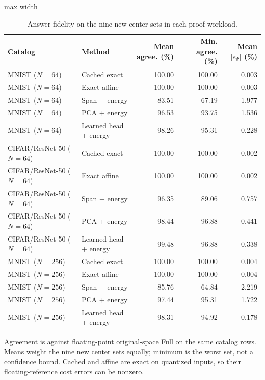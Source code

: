 \begin{table}[tp]
\caption{Answer fidelity on the nine new center sets in each proof workload.}\label{tab:reuse-quality}
\centering\small
\begin{adjustbox}{max width=\textwidth}
\begin{tabular}{@{}llrrr@{}}
\toprule
Catalog & Method & Mean agree. (\%) & Min. agree. (\%) & Mean $|e_\Psi|$ (\%) \\
\midrule
MNIST ($N=64$) & Cached exact & 100.00 & 100.00 & 0.003 \\
MNIST ($N=64$) & Exact affine & 100.00 & 100.00 & 0.003 \\
MNIST ($N=64$) & Span + energy & 83.51 & 67.19 & 1.977 \\
MNIST ($N=64$) & PCA + energy & 96.53 & 93.75 & 1.536 \\
MNIST ($N=64$) & Learned head + energy & 98.26 & 95.31 & 0.228 \\
CIFAR/ResNet-50 ($N=64$) & Cached exact & 100.00 & 100.00 & 0.002 \\
CIFAR/ResNet-50 ($N=64$) & Exact affine & 100.00 & 100.00 & 0.002 \\
CIFAR/ResNet-50 ($N=64$) & Span + energy & 96.35 & 89.06 & 0.757 \\
CIFAR/ResNet-50 ($N=64$) & PCA + energy & 98.44 & 96.88 & 0.441 \\
CIFAR/ResNet-50 ($N=64$) & Learned head + energy & 99.48 & 96.88 & 0.338 \\
MNIST ($N=256$) & Cached exact & 100.00 & 100.00 & 0.004 \\
MNIST ($N=256$) & Exact affine & 100.00 & 100.00 & 0.004 \\
MNIST ($N=256$) & Span + energy & 85.76 & 64.84 & 2.219 \\
MNIST ($N=256$) & PCA + energy & 97.44 & 95.31 & 1.722 \\
MNIST ($N=256$) & Learned head + energy & 98.31 & 94.92 & 0.178 \\
\bottomrule
\end{tabular}
\end{adjustbox}
\par\smallskip\begin{minipage}{0.98\textwidth}\footnotesize Agreement is against floating-point original-space Full on the same catalog rows. Means weight the nine new center sets equally; minimum is the worst set, not a confidence bound. Cached and affine are exact on quantized inputs, so their floating-reference cost errors can be nonzero.\end{minipage}
\end{table}
